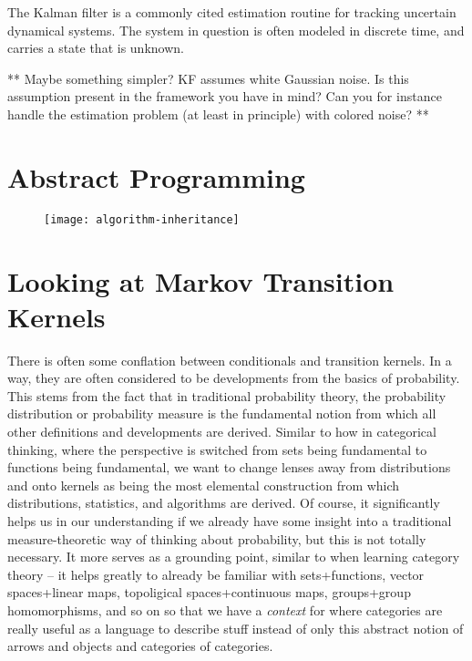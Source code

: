 The Kalman filter is a commonly cited estimation routine for tracking uncertain dynamical systems.
The system in question is often modeled in discrete time, and carries a state that is unknown. 


** Maybe something simpler? KF assumes white Gaussian noise. Is this assumption present in the framework you have in mind? Can you for instance handle the estimation problem (at least in principle) with colored noise? **

\section{Abstract Programming}

\begin{figure}[htb]
    \texttt{[image: algorithm-inheritance]}
	\caption{}
    \label{fig:algorithm-inheritance}
\end{figure}

\section{Looking at Markov Transition Kernels}

There is often some conflation between conditionals and transition kernels.
In a way, they are often considered to be developments from the basics of probability.
This stems from the fact that in traditional probability theory, the probability distribution or probability measure is the fundamental notion from which all other definitions and developments are derived.
Similar to how in categorical thinking, where the perspective is switched from sets being fundamental to functions being fundamental, we want to change lenses away from distributions and onto kernels as being the most elemental construction from which distributions, statistics, and algorithms are derived. 
Of course, it significantly helps us in our understanding if we already have some insight into a traditional measure-theoretic way of thinking about probability, but this is not totally necessary.
It more serves as a grounding point, similar to when learning category theory -- it helps greatly to already be familiar with sets+functions, vector spaces+linear maps, topoligical spaces+continuous maps, groups+group homomorphisms, and so on so that we have a \emph{context} for where categories are really useful as a language to describe stuff instead of only this abstract notion of arrows and objects and categories of categories.

